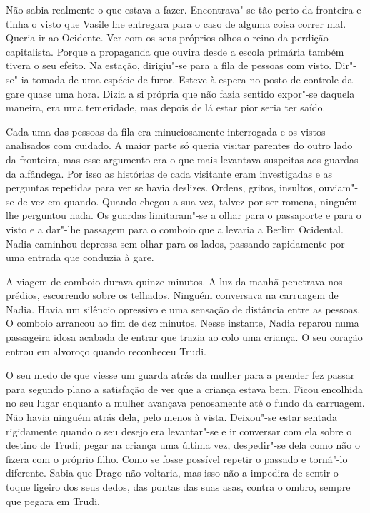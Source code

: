 Não sabia realmente o que estava a fazer. Encontrava"-se tão perto da fronteira e tinha o visto que Vasile lhe entregara para
o caso de alguma coisa correr mal. Queria
ir ao Ocidente. Ver com os seus próprios olhos o reino da perdição
capitalista. Porque a propaganda que ouvira desde a escola primária
também tivera o seu efeito. Na estação, dirigiu"-se para a fila de
pessoas com visto. Dir"-se"-ia tomada de uma espécie de furor. Esteve à espera no posto de controle
da gare quase uma hora. Dizia a si própria que não fazia sentido
expor"-se daquela maneira, era uma temeridade, mas depois de lá estar
pior seria ter saído.

Cada uma das pessoas da fila era minuciosamente interrogada e os
vistos analisados com cuidado. A maior parte só queria visitar parentes
do outro lado da fronteira, mas esse argumento era o que mais levantava
suspeitas aos guardas da alfândega. Por isso as histórias de cada
visitante eram investigadas e as perguntas repetidas para ver se havia
deslizes. Ordens, gritos, insultos, ouviam"-se de vez em quando. Quando
chegou a sua vez, talvez por ser romena, ninguém lhe perguntou nada. Os
guardas limitaram"-se a olhar para o passaporte e para o visto e a
dar"-lhe passagem para o comboio que a levaria a Berlim Ocidental. Nadia
caminhou depressa sem olhar para os lados, passando rapidamente por uma
entrada que conduzia à gare.

A viagem de comboio durava quinze minutos. A luz da manhã penetrava nos
prédios, escorrendo sobre os telhados. Ninguém conversava na carruagem
de Nadia. Havia um silêncio opressivo e uma sensação de distância entre
as pessoas. O comboio arrancou ao fim de dez minutos. Nesse instante,
Nadia reparou numa passageira idosa acabada de entrar que trazia ao colo
uma criança. O seu coração entrou em alvoroço quando reconheceu Trudi.

O seu medo de que viesse um guarda atrás da mulher para a prender fez
passar para segundo plano a satisfação de ver que a criança estava bem.
Ficou encolhida no seu lugar enquanto a mulher avançava penosamente até
o fundo da carruagem. Não havia ninguém atrás dela, pelo menos à vista.
Deixou"-se estar sentada rigidamente quando o seu desejo era levantar"-se
e ir conversar com ela sobre o destino de Trudi; pegar na criança uma
última vez, despedir"-se dela como não o fizera com o próprio filho. Como
se fosse possível repetir o passado e torná"-lo diferente. Sabia que
Drago não voltaria, mas isso não a impedira de sentir o toque ligeiro
dos seus dedos, das pontas das suas asas, contra o ombro, sempre que
pegara em Trudi.

